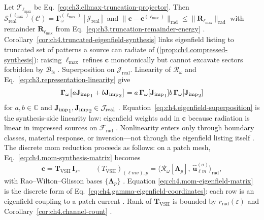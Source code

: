 \label{cor:ch4.truncated-eigenfield-synthesis}
Let \(\mathcal{T}_{\ell_{\max}}\) be Eq.~\eqref{eq:ch3.ellmax-truncation-projector}. Then
\(\mathcal{S}_{\mathrm{real}}^{(\ell_{\max})}(\mathcal{C})
=
\boldsymbol{\Gamma}_\omega^{(\ell_{\max})}[\mathcal{J}_{\mathrm{real}}]\)
and
\(\|\mathbf{c}-\mathbf{c}^{(\ell_{\max})}\|_{\mathrm{rad}}
\le
\|\mathbf{R}_{\ell_{\max}}\|_{\mathrm{rad}}\)
with remainder \(\mathbf{R}_{\ell_{\max}}\) from Eq.~\eqref{eq:ch3.truncation-remainder-energy}
\cite{hansen1988}.
Corollary~\ref{cor:ch4.truncated-eigenfield-synthesis} links eigenfield listing to truncated set of patterns a source can radiate of
(\ref{prop:ch4.compressed-synthesis}): raising \(\ell_{\max}\) refines \(\mathbf{c}\) monotonically but cannot
excavate sectors forbidden by \(\mathcal{B}_{\mathrm{fs}}\) \cite{devaney2004}.
Superposition on \(\mathcal{J}_{\mathrm{real}}\). Linearity of \(\mathcal{R}_\omega\) and Eq.~\eqref{eq:ch3.representation-linearity} give
\begin{equation}
\label{eq:ch4.eigenfield-superposition}
\boldsymbol{\Gamma}_\omega\big[a{\mathbf{J}_{\mathrm{imp}}}_{1}+b{\mathbf{J}_{\mathrm{imp}}}_{2}\big]
=
a\,\boldsymbol{\Gamma}_\omega[{\mathbf{J}_{\mathrm{imp}}}_{1}]
b\,\boldsymbol{\Gamma}_\omega[{\mathbf{J}_{\mathrm{imp}}}_{2}]
\end{equation}
for \(a,b\in\mathbb{C}\) and \({\mathbf{J}_{\mathrm{imp}}}_{1},{\mathbf{J}_{\mathrm{imp}}}_{2}\in\mathcal{J}_{\mathrm{real}}\) \cite{stratton1941}.
Equation~\eqref{eq:ch4.eigenfield-superposition} is the synthesis-side linearity law: eigenfield weights add in
\(\mathbf{c}\) because radiation is linear in impressed sources on \(\mathcal{F}_{\mathrm{rad}}\) \cite{stratton1941}.
Nonlinearity enters only through boundary classes, material response, or inversion---not through the eigenfield listing
itself \cite{harrington2001}.
The discrete mom reduction proceeds as follows: on a patch mesh, Eq.~\eqref{eq:ch4.mom-synthesis-matrix} becomes
\begin{equation}
\label{eq:ch4.mom-eigenfield-matrix}
\mathbf{c}
=
\mathbf{T}_{\mathrm{VSH}}\,\mathbf{I}_{s},
\qquad
(T_{\mathrm{VSH}})_{(\ell m\sigma),p}
=
\big\langle
\mathcal{R}_\omega[\boldsymbol{\Lambda}_{p}],\,
\widehat{\mathbf{u}}_{\ell m}^{(\sigma)}
\big\rangle_{\mathrm{rad}},
\end{equation}
with Rao--Wilton--Glisson bases \(\{\boldsymbol{\Lambda}_{p}\}\) \cite{harrington2001}. Equation
\eqref{eq:ch4.mom-eigenfield-matrix} is the discrete form of Eq.~\eqref{eq:ch4.gamma-eigenfield-coordinates}: each row
is an eigenfield coupling to a patch current \cite{stratton1941}. Rank of \(\mathbf{T}_{\mathrm{VSH}}\) is bounded by
\(r_{\mathrm{rad}}(\varepsilon)\) and Corollary~\ref{cor:ch4.channel-count} \cite{harrington2001}.
